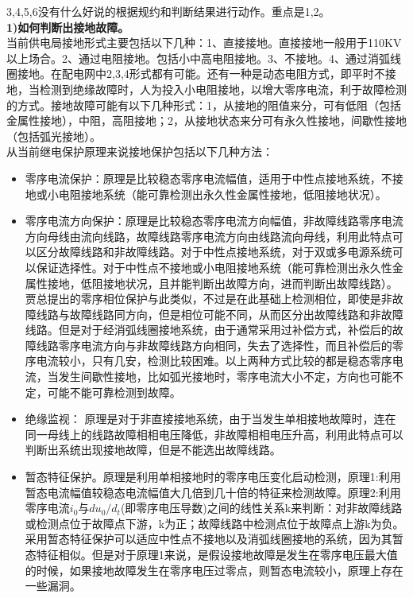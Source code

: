 \documentclass{article}
\begin{document}
\begin{CJK}{UTF8}{gbsn}
	3,4,5,6没有什么好说的根据规约和判断结果进行动作。重点是1,2。\\
	\textbf{1)如何判断出接地故障。}\\
	当前供电局接地形式主要包括以下几种：1、直接接地。直接接地一般用于110KV以上场合。2、通过电阻接地。包括小中高电阻接地。3、不接地。4、通过消弧线圈接地。在配电网中2,3,4形式都有可能。还有一种是动态电阻方式，即平时不接地，当检测到绝缘故障时，人为投入小电阻接地，以增大零序电流，利于故障检测的方式。接地故障可能有以下几种形式：1，从接地的阻值来分，可有低阻（包括金属性接地），中阻，高阻接地；2，从接地状态来分可有永久性接地，间歇性接地（包括弧光接地）。\\
	从当前继电保护原理来说接地保护包括以下几种方法：
	\begin{itemize}
			\item 零序电流保护：原理是比较稳态零序电流幅值，适用于中性点接地系统，不接地或小电阻接地系统（能可靠检测出永久性金属性接地，低阻接地状况）。
			\item 零序电流方向保护：原理是比较稳态零序电流方向幅值，非故障线路零序电流方向母线由流向线路，故障线路零序电流方向由线路流向母线，利用此特点可以区分故障线路和非故障线路。对于中性点接地系统，对于双或多电源系统可以保证选择性。对于中性点不接地或小电阻接地系统（能可靠检测出永久性金属性接地，低阻接地状况，且并能判断出故障方向，进而判断出故障线路）。贾总提出的零序相位保护与此类似，不过是在此基础上检测相位，即使是非故障线路与故障线路同方向，但是相位可能不同，从而区分出故障线路和非故障线路。但是对于经消弧线圈接地系统，由于通常采用过补偿方式，补偿后的故障线路零序电流方向与非故障线路方向相同，失去了选择性，而且补偿后的零序电流较小，只有几安，检测比较困难。以上两种方式比较的都是稳态零序电流，当发生间歇性接地，比如弧光接地时，零序电流大小不定，方向也可能不定，可能不能可靠检测到故障。
			\item 绝缘监视： 原理是对于非直接接地系统，由于当发生单相接地故障时，连在同一母线上的线路故障相相电压降低，非故障相相电压升高，利用此特点可以判断出系统出现接地故障，但是不能选出故障线路。
			\item 暂态特征保护\cite{p1}。原理是利用单相接地时的零序电压变化启动检测，原理1:利用暂态电流幅值较稳态电流幅值大几倍到几十倍的特征来检测故障。原理2:利用零序电流$i_0$与$du_0/d_t$(即零序电压导数)之间的线性关系k来判断：对非故障线路或检测点位于故障点下游，k为正；故障线路中检测点位于故障点上游k为负。采用暂态特征保护可以适应中性点不接地以及消弧线圈接地的系统，因为其暂态特征相似。但是对于原理1来说，是假设接地故障是发生在零序电压最大值的时候，如果接地故障发生在零序电压过零点，则暂态电流较小，原理上存在一些漏洞。\\

\end{itemize}
\end{CJK}
\end{document}

